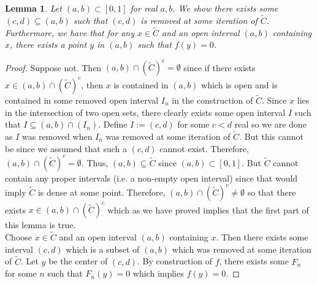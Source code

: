 \documentclass{article}
\newtheorem{lemma}{Lemma}
\begin{document}
    \begin{lemma}
        Let $(a,b)\subset [0,1]$ for real $a,b$. We show there exists some $(c,d)\subseteq (a,b)$ such that $(c,d)$ is removed
        at some iteration of $\widetilde{C}$. Furthermore, we have that for any $x\in\widetilde{C}$ and an open interval $(a,b)$
        containing $x$, there exists a point $y$ in $(a,b)$ such that $f(y) = 0$.
    \end{lemma}
    \begin{proof}
        Suppose not. Then $(a,b)\cap(\widetilde{C})^c = \emptyset$ since if there exists $x\in (a,b)\cap(\widetilde{C})^c$, then
        $x$ is contained in $(a,b)$ which is open and is contained in some removed open interval $I_n$ in the construction of 
        $\widetilde{C}$. Since $x$ lies in the intersection of two open sets, there clearly exists some open interval $I$ such that
        $I \subseteq (a,b)\cap (I_n)$. Define $I := (c,d)$ for some $c<d$ real so we are done as $I$ was removed when $I_n$ was
        removed at some iteration of $\widetilde{C}$. But this cannot be since we assumed that such a $(c,d)$ cannot exist. Therefore,
        $(a,b)\cap(\widetilde{C})^c=\emptyset$. Thus, $(a,b)\subseteq\widetilde{C}$ since $(a,b)\subset [0,1]$. But $\widetilde{C}$
        cannot contain any proper intervals (i.e. a non-empty open interval) since that would imply $\widetilde{C}$ is dense at
        some point. Therefore, $(a,b)\cap(\widetilde{C})^c\neq\emptyset$ so that there exists $x\in(a,b)\cap(\widetilde{C})^c$
        which as we have proved implies that the first part of this lemma is true.\\

        Choose $x\in\widetilde{C}$ and an open interval $(a,b)$ containing $x$. Then there exists some interval $(c,d)$ which
        is a subset of $(a,b)$ which was removed at some iteration of $\widetilde{C}$. Let $y$ be the center of $(c,d)$. By
        construction of $f$, there exists some $F_n$ for some $n$ such that $F_n(y) = 0$ which implies $f(y) = 0$. 
    \end{proof}
    
    
    
\end{document}

